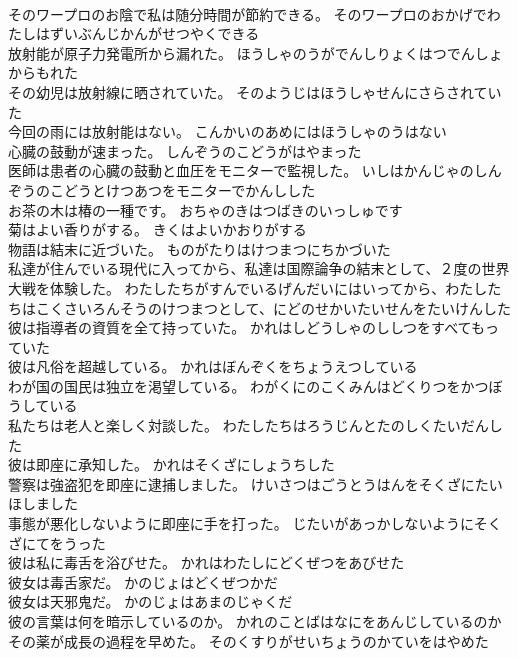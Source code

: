 \documentclass[8pt]{extreport}
\begin{document}
\begin{CJK}{UTF8}{min}
\\	そのワープロのお陰で私は随分時間が節約できる。	そのワープロのおかげでわたしはずいぶんじかんがせつやくできる 
\\	放射能が原子力発電所から漏れた。	ほうしゃのうがでんしりょくはつでんしょからもれた 
\\	その幼児は放射線に晒されていた。	そのようじはほうしゃせんにさらされていた 
\\	今回の雨には放射能はない。	こんかいのあめにはほうしゃのうはない 
\\	心臓の鼓動が速まった。	しんぞうのこどうがはやまった 
\\	医師は患者の心臓の鼓動と血圧をモニターで監視した。	いしはかんじゃのしんぞうのこどうとけつあつをモニターでかんしした 
\\	お茶の木は椿の一種です。	おちゃのきはつばきのいっしゅです 
\\	菊はよい香りがする。	きくはよいかおりがする 
\\	物語は結末に近づいた。	ものがたりはけつまつにちかづいた 
\\	私達が住んでいる現代に入ってから、私達は国際論争の結末として、２度の世界大戦を体験した。	わたしたちがすんでいるげんだいにはいってから、わたしたちはこくさいろんそうのけつまつとして、にどのせかいたいせんをたいけんした 
\\	彼は指導者の資質を全て持っていた。	かれはしどうしゃのししつをすべてもっていた 
\\	彼は凡俗を超越している。	かれはぼんぞくをちょうえつしている 
\\	わが国の国民は独立を渇望している。	わがくにのこくみんはどくりつをかつぼうしている 
\\	私たちは老人と楽しく対談した。	わたしたちはろうじんとたのしくたいだんした 
\\	彼は即座に承知した。	かれはそくざにしょうちした 
\\	警察は強盗犯を即座に逮捕しました。	けいさつはごうとうはんをそくざにたいほしました 
\\	事態が悪化しないように即座に手を打った。	じたいがあっかしないようにそくざにてをうった 
\\	彼は私に毒舌を浴びせた。	かれはわたしにどくぜつをあびせた 
\\	彼女は毒舌家だ。	かのじょはどくぜつかだ 
\\	彼女は天邪鬼だ。	かのじょはあまのじゃくだ 
\\	彼の言葉は何を暗示しているのか。	かれのことばはなにをあんじしているのか 
\\	その薬が成長の過程を早めた。	そのくすりがせいちょうのかていをはやめた 

\end{CJK}
\end{document}
